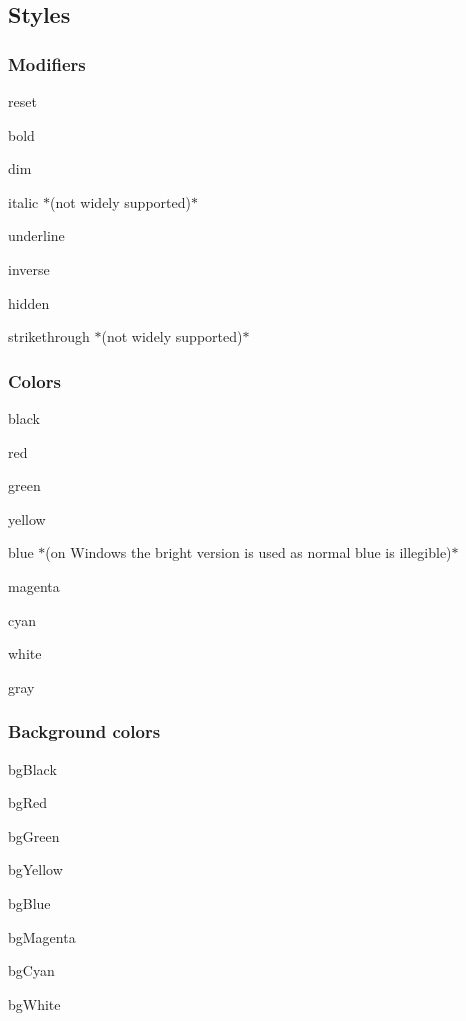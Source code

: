 \subsection*{Styles}

\subsubsection*{Modifiers}


\begin{DoxyItemize}
\item {\ttfamily reset}
\item {\ttfamily bold}
\item {\ttfamily dim}
\item {\ttfamily italic} $\ast$(not widely supported)$\ast$
\item {\ttfamily underline}
\item {\ttfamily inverse}
\item {\ttfamily hidden}
\item {\ttfamily strikethrough} $\ast$(not widely supported)$\ast$
\end{DoxyItemize}

\subsubsection*{Colors}


\begin{DoxyItemize}
\item {\ttfamily black}
\item {\ttfamily red}
\item {\ttfamily green}
\item {\ttfamily yellow}
\item {\ttfamily blue} $\ast$(on Windows the bright version is used as normal blue is illegible)$\ast$
\item {\ttfamily magenta}
\item {\ttfamily cyan}
\item {\ttfamily white}
\item {\ttfamily gray}
\end{DoxyItemize}

\subsubsection*{Background colors}


\begin{DoxyItemize}
\item {\ttfamily bg\+Black}
\item {\ttfamily bg\+Red}
\item {\ttfamily bg\+Green}
\item {\ttfamily bg\+Yellow}
\item {\ttfamily bg\+Blue}
\item {\ttfamily bg\+Magenta}
\item {\ttfamily bg\+Cyan}
\item {\ttfamily bg\+White}
\end{DoxyItemize}

